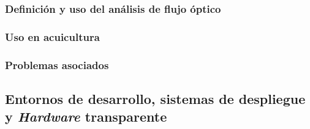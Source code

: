 \subsubsection{Definición y uso del análisis de flujo óptico}

\subsubsection{Uso en acuicultura}

\subsubsection{Problemas asociados}

\subsection{Entornos de desarrollo, sistemas de despliegue y \textit{Hardware} transparente}